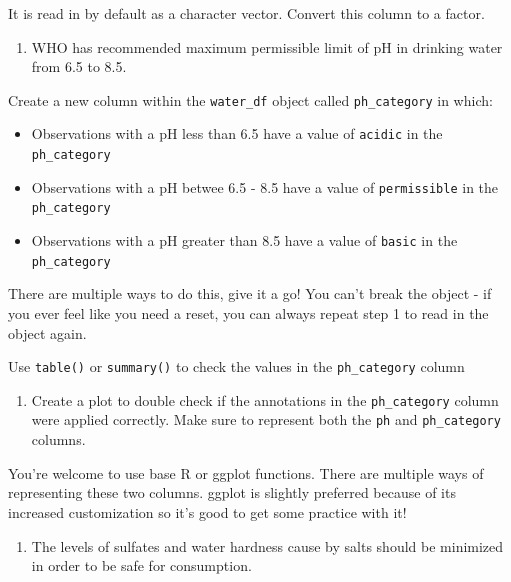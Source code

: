 \documentclass[
]{book}
\providecommand{\tightlist}{%
  \setlength{\itemsep}{0pt}\setlength{\parskip}{0pt}}
\begin{document}
It is read in by default as a character vector. Convert this column to a factor.

\begin{enumerate}
\def\labelenumi{\arabic{enumi}.}
\setcounter{enumi}{3}
\tightlist
\item
  WHO has recommended maximum permissible limit of pH in drinking water from 6.5 to 8.5.
\end{enumerate}

Create a new column within the \texttt{water\_df} object called \texttt{ph\_category} in which:

\begin{itemize}
\tightlist
\item
  Observations with a pH less than 6.5 have a value of \texttt{acidic} in the \texttt{ph\_category}
\item
  Observations with a pH betwee 6.5 - 8.5 have a value of \texttt{permissible} in the \texttt{ph\_category}
\item
  Observations with a pH greater than 8.5 have a value of \texttt{basic} in the \texttt{ph\_category}
\end{itemize}

There are multiple ways to do this, give it a go! You can't break the object - if you ever feel like you need a reset, you can always repeat step 1 to read in the object again.

Use \texttt{table()} or \texttt{summary()} to check the values in the \texttt{ph\_category} column

\begin{enumerate}
\def\labelenumi{\arabic{enumi}.}
\setcounter{enumi}{4}
\tightlist
\item
  Create a plot to double check if the annotations in the \texttt{ph\_category} column were applied correctly. Make sure to represent both the \texttt{ph} and \texttt{ph\_category} columns.
\end{enumerate}

You're welcome to use base R or ggplot functions. There are multiple ways of representing these two columns. ggplot is slightly preferred because of its increased customization so it's good to get some practice with it!

\begin{enumerate}
\def\labelenumi{\arabic{enumi}.}
\setcounter{enumi}{5}
\tightlist
\item
  The levels of sulfates and water hardness cause by salts should be minimized in order to be safe for consumption.
\end{enumerate}
\end{document}
